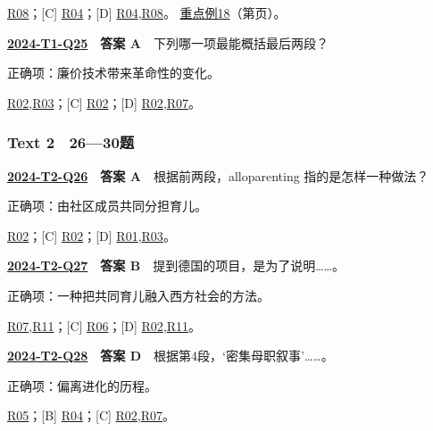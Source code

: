 \documentclass[11pt,a4paper]{article}
\begin{document}
\noindent [A] \hyperref[cat-R08]{R08}；[C] \hyperref[cat-R04]{R04}；[D] \hyperref[cat-R04]{R04},\hyperref[cat-R08]{R08}。
\hyperref[case-2024-T1-Q24]{重点例18}（第\pageref{case-2024-T1-Q24}页）。
\par\smallskip
{}\label{idx-2024-T1-Q25}
\noindent\textbf{\href{https://zj139.github.io/math-notes/english/71d645546a599469a4b050c3/\#q25}{2024-T1-Q25}　答案 A}　下列哪一项最能概括最后两段？\par\nopagebreak
\noindent 正确项：廉价技术带来革命性的变化。\par\nopagebreak
\noindent [B] \hyperref[cat-R02]{R02},\hyperref[cat-R03]{R03}；[C] \hyperref[cat-R02]{R02}；[D] \hyperref[cat-R02]{R02},\hyperref[cat-R07]{R07}。
\par\smallskip
\subsubsection{Text 2　26—30题}
\label{idx-2024-T2-Q26}
\noindent\textbf{\href{https://zj139.github.io/math-notes/english/218043887c082e92ea2ba140/\#q26}{2024-T2-Q26}　答案 A}　根据前两段，alloparenting 指的是怎样一种做法？\par\nopagebreak
\noindent 正确项：由社区成员共同分担育儿。\par\nopagebreak
\noindent [B] \hyperref[cat-R02]{R02}；[C] \hyperref[cat-R02]{R02}；[D] \hyperref[cat-R01]{R01},\hyperref[cat-R03]{R03}。
\par\smallskip
{}\label{idx-2024-T2-Q27}
\noindent\textbf{\href{https://zj139.github.io/math-notes/english/218043887c082e92ea2ba140/\#q27}{2024-T2-Q27}　答案 B}　提到德国的项目，是为了说明……。\par\nopagebreak
\noindent 正确项：一种把共同育儿融入西方社会的方法。\par\nopagebreak
\noindent [A] \hyperref[cat-R07]{R07},\hyperref[cat-R11]{R11}；[C] \hyperref[cat-R06]{R06}；[D] \hyperref[cat-R02]{R02},\hyperref[cat-R11]{R11}。
\par\smallskip
{}\label{idx-2024-T2-Q28}
\noindent\textbf{\href{https://zj139.github.io/math-notes/english/218043887c082e92ea2ba140/\#q28}{2024-T2-Q28}　答案 D}　根据第4段，‘密集母职叙事’……。\par\nopagebreak
\noindent 正确项：偏离进化的历程。\par\nopagebreak
\noindent [A] \hyperref[cat-R05]{R05}；[B] \hyperref[cat-R04]{R04}；[C] \hyperref[cat-R02]{R02},\hyperref[cat-R07]{R07}。
\end{document}
